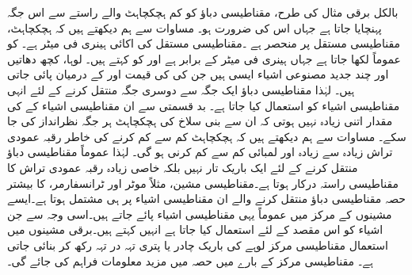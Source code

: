 	بالکل برقی مثال کی طرح، مقناطیسی دباؤ کو کم ہچکچاہٹ والے راستے سے اس جگہ پہنچایا جاتا ہے جہاں اس کی ضرورت ہو۔ مساوات   سے ہم دیکھتے ہیں کہ ہچکچاہٹ،  مقناطیسی مستقل  پر منحصر ہے ۔مقناطیسی مستقل کی اکائی  ہینری فی میٹر  ہے۔ کو عموماً  لکھا جاتا ہے جہاں   ہینری فی میٹر کے برابر ہے اور  کو  کہتے ہیں۔ لوہا،  کچھ دھاتیں اور چند جدید مصنوعی اشیاء  ایسی ہیں جن کی  کی قیمت  اور  کے  درمیان پائی جاتی ہیں۔ لہٰذا مقناطیسی دباؤ  ایک جگہ سے دوسری جگہ منتقل کرنے کے لئے انہی مقناطیسی اشیاء کو  استعمال کیا جاتا ہے۔ بد قسمتی سے ان مقناطیسی اشیاء کے   کی مقدار اتنی زیادہ  نہیں ہوتی کہ ان سے بنی سلاخ کی ہچکچاہٹ ہر جگہ نظرانداز کی جا سکے۔ مساوات   سے ہم دیکھتے ہیں کہ ہچکچاہٹ کم سے کم کرنے کی خاطر رقبہ عمودی تراش زیادہ سے زیادہ اور لمبائی کم سے کم  کرنی ہو گی۔ لہٰذا عموماً مقناطیسی دباؤ منتقل کرنے کے لئے ایک باریک تار نہیں بلکہ خاصی زیادہ رقبہ عمودی تراش کا مقناطیسی راستہ  درکار ہوتا ہے۔مقناطیسی مشین، مثلاً موٹر اور ٹرانسفارمر، کا بیشتر حصہ مقناطیسی دباؤ منتقل کرنے والے ان مقناطیسی اشیاء  پر ہی مشتمل ہوتا ہے۔ایسے مشینوں کے مرکز میں عموماً یہی مقناطیسی اشیاء پائے جاتے ہیں۔اسی وجہ سے  جن اشیاء کو اس مقصد کے لئے  استعمال کیا جاتا ہے انہیں  کہتے ہیں۔برقی مشینوں میں استعمال  مقناطیسی مرکز لوہے کی باریک چادر یا پتری  تہہ  در تہہ رکھ کر بنائی جاتی ہے۔ مقناطیسی مرکز کے بارے میں حصہ   میں مزید معلومات فراہم کی جائے گی۔

